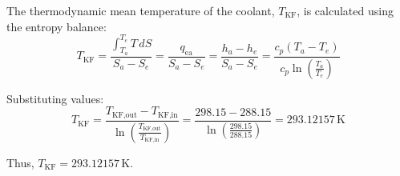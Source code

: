 The thermodynamic mean temperature of the coolant, \( T_{\text{KF}} \), is calculated using the entropy balance:  
\[
T_{\text{KF}} = \frac{\int_{T_a}^{T_e} T \, dS}{S_a - S_e} = \frac{q_{\text{ea}}}{S_a - S_e} = \frac{h_a - h_e}{S_a - S_e} = \frac{c_p (T_a - T_e)}{c_p \ln \left( \frac{T_a}{T_e} \right)}  
\]  

Substituting values:  
\[
T_{\text{KF}} = \frac{T_{\text{KF,out}} - T_{\text{KF,in}}}{\ln \left( \frac{T_{\text{KF,out}}}{T_{\text{KF,in}}} \right)} = \frac{298.15 - 288.15}{\ln \left( \frac{298.15}{288.15} \right)} = 293.12157 \, \text{K}  
\]  

Thus, \( T_{\text{KF}} = 293.12157 \, \text{K} \).